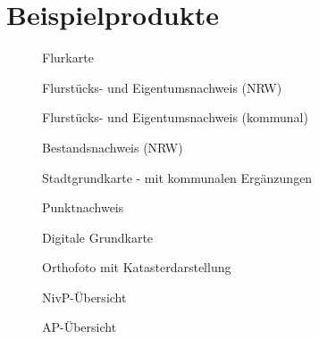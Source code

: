 \chapter{Beispielprodukte}
\begin{figure}[htbp]
	\centering
	\caption{Flurkarte}
	\label{fig:flurkarte}
\end{figure}
\begin{figure}[htbp]
	\centering
	\caption{Flurstücks- und Eigentumsnachweis (NRW)}
	\label{fig:eigentumsnachweis_nrw}
\end{figure}
\begin{figure}[htbp]
	\centering
	\caption{Flurstücks- und Eigentumsnachweis (kommunal)}
	\label{fig:eigentumsnachweis_kom}
\end{figure}
\begin{figure}[htbp]
	\centering
	\caption{Bestandsnachweis (NRW)}
	\label{fig:bestandsnachweis_nrw}
\end{figure}
\begin{figure}[htbp]
	\centering
	\caption{Stadtgrundkarte - mit kommunalen Ergänzungen}
	\label{fig:stadtgrundkarte}
\end{figure}
\begin{figure}[htbp]
	\centering
	\caption{Punktnachweis}
	\label{fig:punktnachweis}
\end{figure}
\begin{figure}[htbp]
	\centering
	\caption{Digitale Grundkarte}
	\label{fig:digitale_grundkarte}
\end{figure}
\begin{figure}[htbp]
	\centering
	\caption{Orthofoto mit Katasterdarstellung}
	\label{fig:orthofoto-katasterdarstellung}
\end{figure}
\begin{figure}[htbp]
	\centering
	\caption{NivP-Übersicht}
	\label{fig:nivp-uebersicht}
\end{figure}
\begin{figure}[htbp]
	\centering
	\caption{AP-Übersicht}
	\label{fig:ap-uebersicht}
\end{figure}
